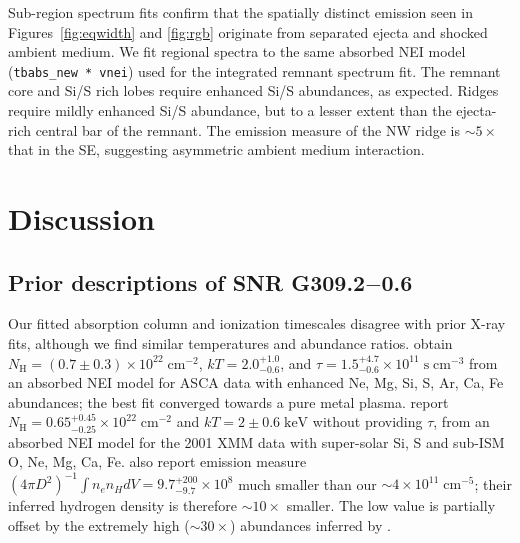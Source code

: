 \documentclass[twocolumn,tighten,trackchanges]{aastex61}
\newcommand*{\mt}{\mathrm}
\newcommand*{\unit}[1]{\;\mt{#1}}  %
\newcommand*{\abt}{\mathord{\sim}} %
\newcommand*{\nH}{N_{\mathrm{H}}}
\newcommand*{\nHUnits}{\times 10^{22} \unit{cm^{-2}}}
\newcommand*{\kB}{k}  %
\newcommand*{\Gsnr}{G309.2$-$0.6}
\begin{document}

Sub-region spectrum fits confirm that the spatially distinct emission seen in
Figures~\ref{fig:eqwidth} and \ref{fig:rgb} originate from separated ejecta and
shocked ambient medium.
We fit regional spectra to the same absorbed NEI model
(\texttt{tbabs\_new * vnei}) used for the integrated remnant spectrum fit.
The remnant core and Si/S rich lobes require enhanced Si/S abundances, as
expected.
Ridges require mildly enhanced Si/S abundance, but to a lesser extent than the
ejecta-rich central bar of the remnant.
The emission measure of the NW ridge is $\abt 5\times$ that in the SE,
suggesting asymmetric ambient medium interaction.


\section{Discussion} \label{sec:disc}

\subsection{Prior descriptions of SNR \Gsnr{}}

Our fitted absorption column and ionization timescales disagree with prior
X-ray fits, although we find similar temperatures and abundance ratios.
\citet{rakowski2001} obtain $\nH = (0.7 \pm 0.3) \nHUnits$,
$\kB T = 2.0^{+1.0}_{-0.6}$, and
$\tau = 1.5^{+4.7}_{-0.6} \times 10^{11} \unit{s\;cm^{-3}}$
from an absorbed NEI model for ASCA data with enhanced Ne, Mg, Si, S, Ar, Ca,
Fe abundances; the best fit converged towards a pure metal plasma.
\citet{safi-harb2007} report $\nH = 0.65^{+0.45}_{-0.25} \nHUnits$
and $\kB T = 2 \pm 0.6 \unit{keV}$ without providing $\tau$, from
an absorbed NEI model for the 2001 XMM data with
super-solar Si, S and sub-ISM O, Ne, Mg, Ca, Fe.
\citet{rakowski2001} also report emission measure
$(4\pi D^2)^{-1} \int n_e n_H dV = 9.7^{+200}_{-9.7} \times 10^8$ much smaller
than our $\abt 4 \times 10^{11} \unit{cm^{-5}}$; their inferred hydrogen
density is therefore $\abt 10\times$ smaller.
The low value is partially offset by the extremely high ($\abt 30\times$)
abundances inferred by \citet{rakowski2001}.
\end{document}
